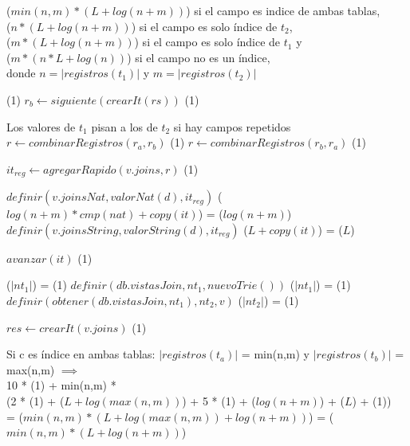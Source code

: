     {\bigo($min(n,m) * (L + log(n + m))$) si el campo es indice de ambas tablas, \\
        \hspace*{8.25em} \bigo($n * (L + log(n + m))$) si el campo es solo índice de $t_2$, \\
        \hspace*{8.25em} \bigo($m * (L + log(n + m))$) si el campo es solo índice de $t_1$ y \\
        \hspace*{8.25em} \bigo($m * (n * L + log(n))$) si el campo no es un índice, \\
        \hspace*{8.25em} donde $n = |registros(t_1)|$ y $m = |registros(t_2)|$}{
                                                \comment \bigo(1)
            \State $r_b \gets siguiente(crearIt(rs))$               \comment \bigo(1)

            \State
            \State \icomment Los valores de $t_1$ pisan a los de $t_2$ si hay campos repetidos
                \State $r \gets combinarRegistros(r_a, r_b)$        \comment \bigo(1)
            \Else
                \State $r \gets combinarRegistros(r_b, r_a)$        \comment \bigo(1)
            \EndIf

            \State $it_{reg} \gets agregarRapido(v.joins, r)$       \comment \bigo(1)

            \State
                \State $definir(v.joinsNat, valorNat(d), it_{reg})$         \comment \bigo($log(n+m) * cmp(nat) + copy(it)$) = \bigo($log(n+m)$)
            \Else
                \State $definir(v.joinsString, valorString(d), it_{reg})$   \comment \bigo($L + copy(it)$) = \bigo($L$)
            \EndIf
        \EndIf

        \State $avanzar(it)$                                        \comment \bigo(1)
    \EndWhile

    \State
                              \comment \bigo($|nt_1|$) = \bigo(1)
        \State $definir(db.vistasJoin, nt_1, nuevoTrie())$          \comment \bigo($|nt_1|$) = \bigo(1)
    \EndIf
    \State $definir(obtener(db.vistasJoin, nt_1), nt_2, v)$         \comment \bigo($|nt_2|$) = \bigo(1)

    \State $res \gets crearIt(v.joins)$                             \comment \bigo(1)

}{Si c es índice en ambas tablas: $|registros(t_a)|$ = min(n,m) y $|registros(t_b)|$ = max(n,m) $\implies$ \\
    \hspace*{12em} 10 * \bigo(1) + min(n,m) * \\
    \hspace*{14em} (2 * \bigo(1) + \bigo($L + log(max(n,m))$) + 5 * \bigo(1) + \bigo($log(n + m)$) + \bigo($L$) + \bigo(1)) \\
    \hspace*{12em} = \bigo($min(n,m) * (L + log(max(n,m)) + log(n + m))$) = \bigo($min(n,m) * (L + log(n + m))$) \\

}
